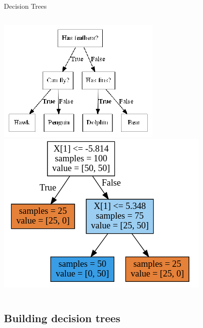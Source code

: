 \documentclass[10pt,compress]{beamer} %
\begin{document}
\begin{frame}{Decision Trees}
\begin{columns}
            \centering \includegraphics[width=\linewidth]{figs/tree-game.png}\\
            \centering \includegraphics[width=0.8\linewidth]{figs/tree-example2.png}
    \end{columns}
\end{frame}

\subsection{Building decision trees}
\end{document}
